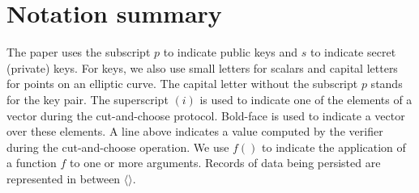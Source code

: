 \documentclass[sigconf, authordraft]{acmart}
\begin{document}


\newpage
\appendix

\section{Notation summary}

The paper uses the subscript $p$ to indicate public keys and $s$ to
indicate secret (private) keys.  For keys, we also use small letters
for scalars and capital letters for points on an elliptic curve.  The
capital letter without the subscript $p$ stands for the key pair.  The
superscript $(i)$ is used to indicate one of the elements of a vector
during the cut-and-choose protocol.  Bold-face is used to indicate a
vector over these elements.  A line above indicates a value computed
by the verifier during the cut-and-choose operation.  We use $f()$ to
indicate the application of a function $f$ to one or more arguments. Records of
data being persisted are represented in between $\langle\rangle$.
\end{document}
